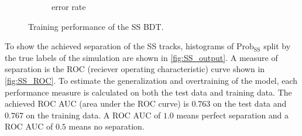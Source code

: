\begin{figure}
\begin{subfigure}{0.5\textwidth}
        \caption{error rate}
    \end{subfigure}%
    \caption{Training performance of the SS BDT.}
    \label{fig:SS_history}
\end{figure}

To show the achieved separation of the SS tracks, histograms of $\text{Prob}_\text{SS}$ split by the true labels of the simulation are shown in \cref{fig:SS_output}.
A measure of separation is the ROC (reciever operating characteristic) curve shown in \cref{fig:SS_ROC}.
To estimate the generalization and overtraining of the model, each performance measure is calculated on both the test data and training data.
The achieved ROC AUC (area under the ROC curve) is $0.763$ on the test data and $0.767$ on the training data.
A ROC AUC of $1.0$ means perfect separation and a ROC AUC of $0.5$ means no separation.

